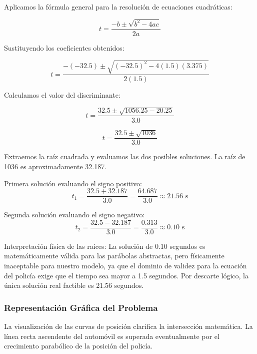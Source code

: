 \documentclass[12pt, a4paper]{article}
\begin{document}
Aplicamos la fórmula general para la resolución de ecuaciones cuadráticas:

\begin{equation}
t = \frac{-b \pm \sqrt{b^2 - 4ac}}{2a}
\end{equation}

Sustituyendo los coeficientes obtenidos:

\begin{equation}
t = \frac{-(-32.5) \pm \sqrt{(-32.5)^2 - 4(1.5)(3.375)}}{2(1.5)}
\end{equation}

Calculamos el valor del discriminante:

\begin{equation}
t = \frac{32.5 \pm \sqrt{1056.25 - 20.25}}{3.0}
\end{equation}

\begin{equation}
t = \frac{32.5 \pm \sqrt{1036}}{3.0}
\end{equation}

Extraemos la raíz cuadrada y evaluamos las dos posibles soluciones. La raíz de 1036 es aproximadamente 32.187.

Primera solución evaluando el signo positivo:
\begin{equation}
t_1 = \frac{32.5 + 32.187}{3.0} = \frac{64.687}{3.0} \approx 21.56 \text{ s}
\end{equation}

Segunda solución evaluando el signo negativo:
\begin{equation}
t_2 = \frac{32.5 - 32.187}{3.0} = \frac{0.313}{3.0} \approx 0.10 \text{ s}
\end{equation}

Interpretación física de las raíces: La solución de 0.10 segundos es matemáticamente válida para las parábolas abstractas, pero físicamente inaceptable para nuestro modelo, ya que el dominio de validez para la ecuación del policía exige que el tiempo sea mayor a 1.5 segundos. Por descarte lógico, la única solución real factible es 21.56 segundos.

\subsubsection*{Representación Gráfica del Problema}

La visualización de las curvas de posición clarifica la intersección matemática. La línea recta ascendente del automóvil es superada eventualmente por el crecimiento parabólico de la posición del policía.
\end{document}
